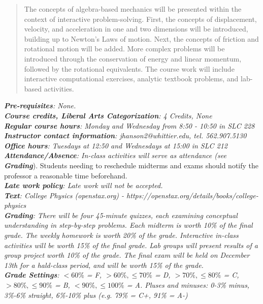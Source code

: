 \documentclass[10pt]{article}
\begin{document}
\maketitle

\begin{abstract}
The concepts of algebra-based mechanics will be presented within the context of interactive problem-solving.  First, the concepts of displacement, velocity, and acceleration in one and two dimensions will be introduced, building up to Newton's Laws of motion.  Next, the concepts of friction and rotational motion will be added.  More complex problems will be introduced through the conservation of energy and linear momentum, followed by the rotational equivalents.  The course work will include interactive computational exercises, analytic textbook problems, and lab-based activities.
\end{abstract}
\noindent
\textit{\textbf{Pre-requisites}: None.} \\
\textit{\textbf{Course credits, Liberal Arts Categorization}: 4 Credits, None} \\
\textit{\textbf{Regular course hours}: Monday and Wednesday from 8:50 - 10:50 in SLC 228} \\
\textit{\textbf{Instructor contact information}: jhanson2@whittier.edu, tel. 562.907.5130} \\
\textit{\textbf{Office hours}: Tuesdays at 12:50 and Wednesdays at 15:00 in SLC 212} \\
\textit{\textbf{Attendance/Absence}: In-class activities will serve as attendance (see \textit{\textbf{Grading}}}).  Students needing to reschedule midterms and exams should notify the professor a reasonable time beforehand. \\
\textit{\textbf{Late work policy}: Late work will not be accepted.} \\
\textit{\textbf{Text}: College Physics (openstax.org) -  https://openstax.org/details/books/college-physics} \\
\textit{\textbf{Grading}: There will be four 45-minute quizzes, each examining conceptual understanding in step-by-step problems.  Each midterm is worth 10\% of the final grade.  The weekly homework is worth 20\% of the grade.  Interactive in-class activities will be worth 15\% of the final grade.  Lab groups will present results of a group project worth 10\% of the grade.  The final exam will be held on December 13th for a hald-class period, and will be worth 15\% of the grade.} \\
\textit{\textbf{Grade Settings}: $<60\%$ = F, $>60\%,\leq 70\%$ = D, $>70\%,\leq80\%$ = C, $>80\%,\leq 90\%$ = B, $<90\%,\leq 100\%$ = A.  Pluses and minuses: 0-3\% minus, 3\%-6\% straight, 6\%-10\% plus (e.g. 79\% = C+, 91\% = A-)} \\
\end{document}
